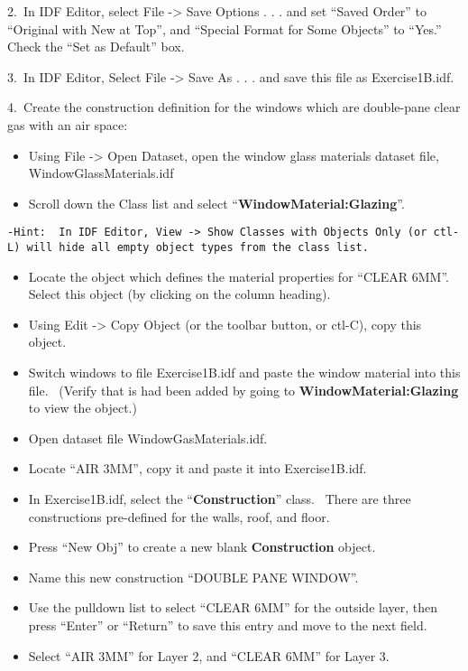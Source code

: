 2.~In IDF Editor, select File -\textgreater{} Save Options . . . and set ``Saved Order'' to ``Original with New at Top'', and ``Special Format for Some Objects'' to ``Yes.''~ Check the ``Set as Default'' box.

3.~In IDF Editor, Select File -\textgreater{} Save As . . . and save this file as Exercise1B.idf.

4.~Create the construction definition for the windows which are double-pane clear gas with an air space:

\begin{itemize}
\item
  Using File -\textgreater{} Open Dataset, open the window glass materials dataset file, WindowGlassMaterials.idf
\item
  Scroll down the Class list and select ``\textbf{WindowMaterial:Glazing}''.
\end{itemize}

\begin{lstlisting}
-Hint:  In IDF Editor, View -> Show Classes with Objects Only (or ctl-L) will hide all empty object types from the class list.
\end{lstlisting}

\begin{itemize}
\item
  Locate the object which defines the material properties for ``CLEAR 6MM''.~ Select this object (by clicking on the column heading).
\item
  Using Edit -\textgreater{} Copy Object (or the toolbar button, or ctl-C), copy this object.
\item
  Switch windows to file Exercise1B.idf and paste the window material into this file.~ (Verify that is had been added by going to \textbf{WindowMaterial:Glazing} to view the object.)
\item
  Open dataset file WindowGasMaterials.idf.
\item
  Locate ``AIR 3MM'', copy it and paste it into Exercise1B.idf.
\item
  In Exercise1B.idf, select the ``\textbf{Construction}'' class.~ There are three constructions pre-defined for the walls, roof, and floor.
\item
  Press ``New Obj'' to create a new blank \textbf{Construction} object.
\item
  Name this new construction ``DOUBLE PANE WINDOW''.
\item
  Use the pulldown list to select ``CLEAR 6MM'' for the outside layer, then press ``Enter'' or ``Return'' to save this entry and move to the next field.
\item
  Select ``AIR 3MM'' for Layer 2, and ``CLEAR 6MM'' for Layer 3.
\end{itemize}

